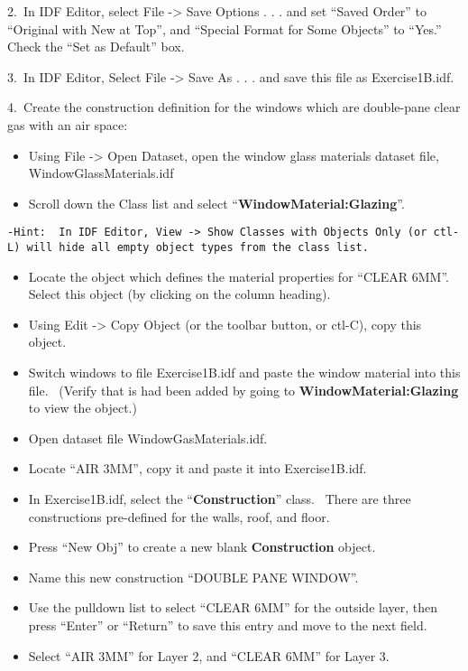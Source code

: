 2.~In IDF Editor, select File -\textgreater{} Save Options . . . and set ``Saved Order'' to ``Original with New at Top'', and ``Special Format for Some Objects'' to ``Yes.''~ Check the ``Set as Default'' box.

3.~In IDF Editor, Select File -\textgreater{} Save As . . . and save this file as Exercise1B.idf.

4.~Create the construction definition for the windows which are double-pane clear gas with an air space:

\begin{itemize}
\item
  Using File -\textgreater{} Open Dataset, open the window glass materials dataset file, WindowGlassMaterials.idf
\item
  Scroll down the Class list and select ``\textbf{WindowMaterial:Glazing}''.
\end{itemize}

\begin{lstlisting}
-Hint:  In IDF Editor, View -> Show Classes with Objects Only (or ctl-L) will hide all empty object types from the class list.
\end{lstlisting}

\begin{itemize}
\item
  Locate the object which defines the material properties for ``CLEAR 6MM''.~ Select this object (by clicking on the column heading).
\item
  Using Edit -\textgreater{} Copy Object (or the toolbar button, or ctl-C), copy this object.
\item
  Switch windows to file Exercise1B.idf and paste the window material into this file.~ (Verify that is had been added by going to \textbf{WindowMaterial:Glazing} to view the object.)
\item
  Open dataset file WindowGasMaterials.idf.
\item
  Locate ``AIR 3MM'', copy it and paste it into Exercise1B.idf.
\item
  In Exercise1B.idf, select the ``\textbf{Construction}'' class.~ There are three constructions pre-defined for the walls, roof, and floor.
\item
  Press ``New Obj'' to create a new blank \textbf{Construction} object.
\item
  Name this new construction ``DOUBLE PANE WINDOW''.
\item
  Use the pulldown list to select ``CLEAR 6MM'' for the outside layer, then press ``Enter'' or ``Return'' to save this entry and move to the next field.
\item
  Select ``AIR 3MM'' for Layer 2, and ``CLEAR 6MM'' for Layer 3.
\end{itemize}

